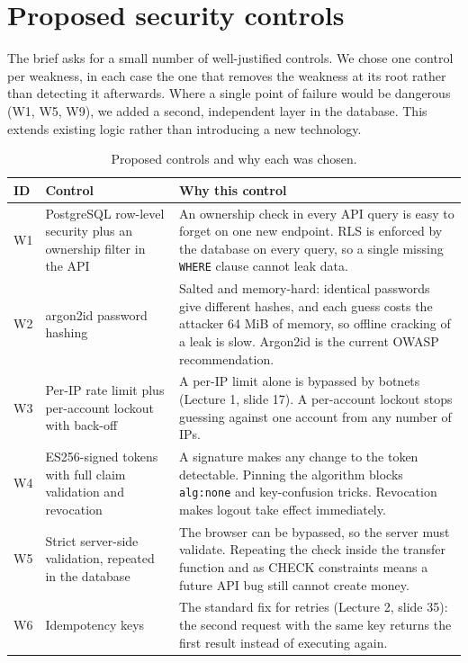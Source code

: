 \documentclass[11pt,a4paper]{article}
\newcommand{\code}[1]{\texttt{#1}}
\begin{document}
\section{Proposed security controls}

The brief asks for a small number of well-justified controls. We chose one control per weakness, in each case the one that removes the weakness at its root rather than detecting it afterwards. Where a single point of failure would be dangerous (W1, W5, W9), we added a second, independent layer in the database. This extends existing logic rather than introducing a new technology.

\begin{table}[H]
\centering\small
\caption{Proposed controls and why each was chosen.}
\begin{tabularx}{\textwidth}{lP{4.4cm}Y}
\toprule
ID & Control & Why this control \\
\midrule
W1 & PostgreSQL row-level security plus an ownership filter in the API & An ownership check in every API query is easy to forget on one new endpoint. RLS is enforced by the database on every query, so a single missing \code{WHERE} clause cannot leak data. \\
W2 & argon2id password hashing & Salted and memory-hard: identical passwords give different hashes, and each guess costs the attacker 64 MiB of memory, so offline cracking of a leak is slow. Argon2id is the current OWASP recommendation. \\
W3 & Per-IP rate limit plus per-account lockout with back-off & A per-IP limit alone is bypassed by botnets (Lecture 1, slide 17). A per-account lockout stops guessing against one account from any number of IPs. \\
W4 & ES256-signed tokens with full claim validation and revocation & A signature makes any change to the token detectable. Pinning the algorithm blocks \code{alg:none} and key-confusion tricks. Revocation makes logout take effect immediately. \\
W5 & Strict server-side validation, repeated in the database & The browser can be bypassed, so the server must validate. Repeating the check inside the transfer function and as CHECK constraints means a future API bug still cannot create money. \\
W6 & Idempotency keys & The standard fix for retries (Lecture 2, slide 35): the second request with the same key returns the first result instead of executing again. \\

\end{tabularx}
\end{table}
\end{document}

